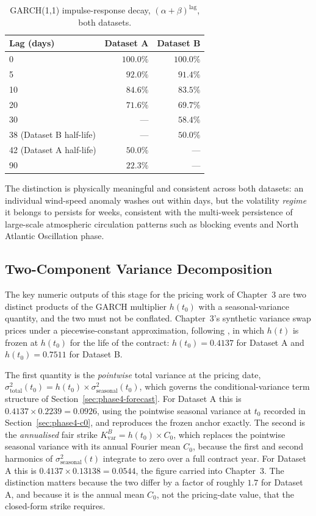 \begin{table}[htbp]
\centering
\caption{GARCH(1,1) impulse-response decay, $(\alpha+\beta)^{\text{lag}}$, both datasets.}
\label{tab:garch-impulse}
\begin{tabular}{l r r}
\toprule
\textbf{Lag (days)} & \textbf{Dataset A} & \textbf{Dataset B} \\
\midrule
0 & $100.0\%$ & $100.0\%$ \\
5 & $92.0\%$ & $91.4\%$ \\
10 & $84.6\%$ & $83.5\%$ \\
20 & $71.6\%$ & $69.7\%$ \\
30 & --- & $58.4\%$ \\
38 (Dataset B half-life) & --- & $50.0\%$ \\
42 (Dataset A half-life) & $50.0\%$ & --- \\
90 & $22.3\%$ & --- \\
\bottomrule
\end{tabular}
\end{table}

The distinction is physically meaningful and consistent across both datasets: an individual wind-speed anomaly washes out within days, but the volatility \emph{regime} it belongs to persists for weeks, consistent with the multi-week persistence of large-scale atmospheric circulation patterns such as blocking events and North Atlantic Oscillation phase.

\subsection{Two-Component Variance Decomposition}
\label{sec:phase3-decomp}

The key numeric outputs of this stage for the pricing work of Chapter~3 are two distinct products of the GARCH multiplier $h(t_0)$ with a seasonal-variance quantity, and the two must not be conflated. Chapter~3's synthetic variance swap prices under a piecewise-constant approximation, following \citet{Tol1997}, in which $h(t)$ is frozen at $h(t_0)$ for the life of the contract: $h(t_0) = 0.4137$ for Dataset A and $h(t_0) = 0.7511$ for Dataset B.

The first quantity is the \emph{pointwise} total variance at the pricing date, $\sigma^2_{\text{total}}(t_0) = h(t_0) \times \sigma^2_{\text{seasonal}}(t_0)$, which governs the conditional-variance term structure of Section~\ref{sec:phase4-forecast}. For Dataset A this is $0.4137 \times 0.2239 = 0.0926$, using the pointwise seasonal variance at $t_0$ recorded in Section~\ref{sec:phase4-c0}, and reproduces the frozen anchor exactly. The second is the \emph{annualised} fair strike $K_{\text{var}}^B = h(t_0) \times C_0$, which replaces the pointwise seasonal variance with its annual Fourier mean $C_0$, because the first and second harmonics of $\sigma^2_{\text{seasonal}}(t)$ integrate to zero over a full contract year. For Dataset A this is $0.4137 \times 0.13138 = 0.0544$, the figure carried into Chapter~3. The distinction matters because the two differ by a factor of roughly $1.7$ for Dataset A, and because it is the annual mean $C_0$, not the pricing-date value, that the closed-form strike requires.

